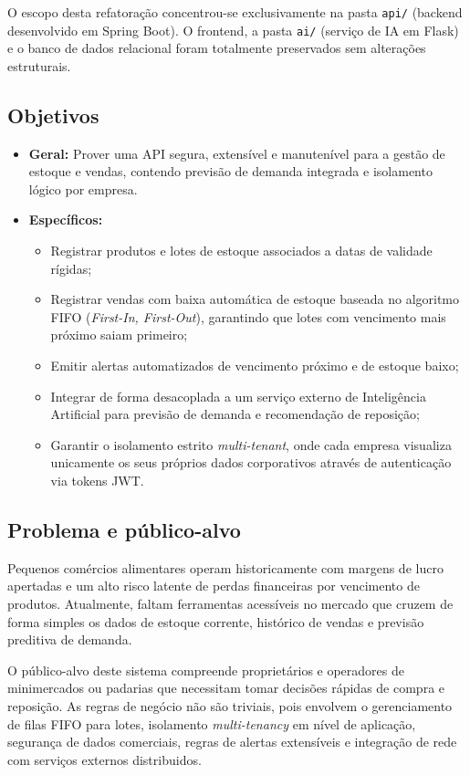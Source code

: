 \documentclass[12pt,a4paper]{article}
\begin{document}
O escopo desta refatoração concentrou-se exclusivamente na pasta \texttt{api/} (backend desenvolvido em Spring Boot). O frontend, a pasta \texttt{ai/} (serviço de IA em Flask) e o banco de dados relacional foram totalmente preservados sem alterações estruturais.

\subsection{Objetivos}
\begin{itemize}
    \item \textbf{Geral:} Prover uma API segura, extensível e manutenível para a gestão de estoque e vendas, contendo previsão de demanda integrada e isolamento lógico por empresa.
    \item \textbf{Específicos:}
    \begin{itemize}
        \item Registrar produtos e lotes de estoque associados a datas de validade rígidas;
        \item Registrar vendas com baixa automática de estoque baseada no algoritmo FIFO (\textit{First-In, First-Out}), garantindo que lotes com vencimento mais próximo saiam primeiro;
        \item Emitir alertas automatizados de vencimento próximo e de estoque baixo;
        \item Integrar de forma desacoplada a um serviço externo de Inteligência Artificial para previsão de demanda e recomendação de reposição;
        \item Garantir o isolamento estrito \textit{multi-tenant}, onde cada empresa visualiza unicamente os seus próprios dados corporativos através de autenticação via tokens JWT.
    \end{itemize}
\end{itemize}

\subsection{Problema e público-alvo}
Pequenos comércios alimentares operam historicamente com margens de lucro apertadas e um alto risco latente de perdas financeiras por vencimento de produtos. Atualmente, faltam ferramentas acessíveis no mercado que cruzem de forma simples os dados de estoque corrente, histórico de vendas e previsão preditiva de demanda. 

O público-alvo deste sistema compreende proprietários e operadores de minimercados ou padarias que necessitam tomar decisões rápidas de compra e reposição. As regras de negócio não são triviais, pois envolvem o gerenciamento de filas FIFO para lotes, isolamento \textit{multi-tenancy} em nível de aplicação, segurança de dados comerciais, regras de alertas extensíveis e integração de rede com serviços externos distribuidos.
\end{document}
